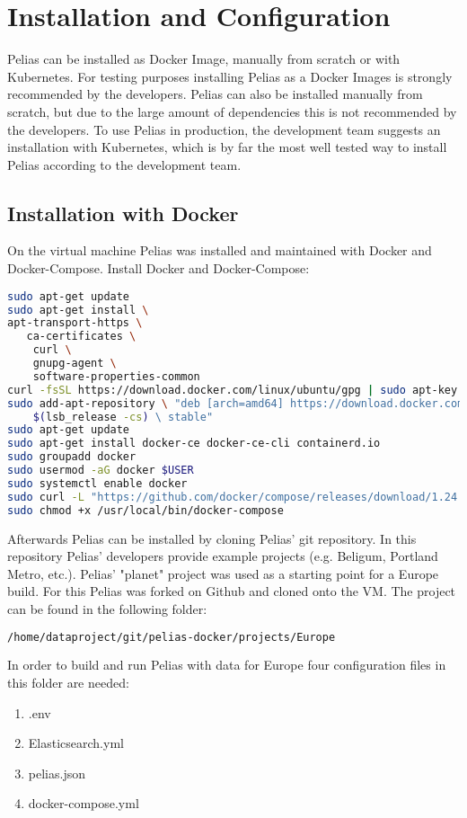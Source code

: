 \section{Installation and Configuration}
Pelias can be installed as Docker Image, manually from scratch or with Kubernetes. For testing purposes installing Pelias as a Docker Images is strongly recommended by the developers\cite{Simioni2018b}. Pelias can also be installed manually from scratch, but due to the large amount of dependencies this is not recommended by the developers. To use Pelias in production, the development team suggests an installation with Kubernetes, which is by far the most well tested way to install Pelias according to the development team.

\subsection{Installation with Docker}
On the virtual machine Pelias was installed and maintained with Docker and Docker-Compose. Install Docker and Docker-Compose:
\begin{lstlisting}[language=bash,breaklines=true]
sudo apt-get update
sudo apt-get install \
apt-transport-https \
   ca-certificates \
	curl \
	gnupg-agent \
	software-properties-common
curl -fsSL https://download.docker.com/linux/ubuntu/gpg | sudo apt-key add -
sudo add-apt-repository \ "deb [arch=amd64] https://download.docker.com/linux/ubuntu \
	$(lsb_release -cs) \ stable"
sudo apt-get update
sudo apt-get install docker-ce docker-ce-cli containerd.io
sudo groupadd docker
sudo usermod -aG docker $USER
sudo systemctl enable docker
sudo curl -L "https://github.com/docker/compose/releases/download/1.24.0/docker-compose-$(uname -s)-$(uname -m)" -o /usr/local/bin/docker-compose
sudo chmod +x /usr/local/bin/docker-compose
\end{lstlisting}
Afterwards Pelias can be installed by cloning Pelias' git repository. In this repository Pelias' developers provide example projects (e.g. Beligum, Portland Metro, etc.). Pelias' "planet" project was used as a starting point for a Europe build. For this Pelias was forked on Github and cloned onto the VM. The project can be found in the following folder:
\begin{lstlisting}[language=bash,breaklines=true]
/home/dataproject/git/pelias-docker/projects/Europe
\end{lstlisting}
In order to build and run Pelias with data for Europe four configuration files in this folder are needed:
\begin{enumerate}
\item .env
\item Elasticsearch.yml
\item pelias.json
\item docker-compose.yml
\end{enumerate}
